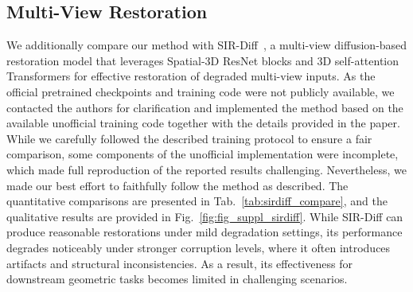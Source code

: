 \subsection{Multi-View Restoration}
We additionally compare our method with SIR-Diff~\cite{mao2025sir}, a multi-view diffusion-based restoration model that leverages Spatial-3D ResNet blocks and 3D self-attention Transformers for effective restoration of degraded multi-view inputs. As the official pretrained checkpoints and training code were not publicly available, we contacted the authors for clarification and implemented the method based on the available unofficial training code together with the details provided in the paper. While we carefully followed the described training protocol to ensure a fair comparison, some components of the unofficial implementation were incomplete, which made full reproduction of the reported results challenging. Nevertheless, we made our best effort to faithfully follow the method as described. The quantitative comparisons are presented in Tab.~\ref{tab:sirdiff_compare}, and the qualitative results are provided in Fig.~\ref{fig:fig_suppl_sirdiff}. While SIR-Diff can produce reasonable restorations under mild degradation settings, its performance degrades noticeably under stronger corruption levels, where it often introduces artifacts and structural inconsistencies. As a result, its effectiveness for downstream geometric tasks becomes limited in challenging scenarios.
\vspace{-10pt}

\vspace{-15pt}







